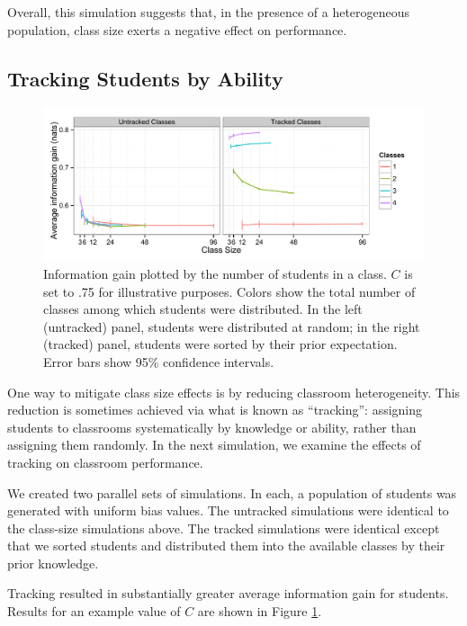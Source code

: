 \documentclass[10pt,letterpaper]{article}
\begin{document}
Overall, this simulation suggests that, in the presence of a heterogeneous population, class size exerts a negative effect on performance. 

\subsection{Tracking Students by Ability}

\begin{figure}
\begin{center}
\includegraphics[width=5.5in]{figures/tracking.pdf}
\end{center}
\caption{\label{fig:tracking} Information gain plotted by the number of students in a class. $C$ is set to .75 for illustrative purposes. Colors show the total number of classes among which students were distributed. In the left (untracked) panel, students were distributed at random; in the right (tracked) panel, students were sorted by their prior expectation. Error bars show 95\% confidence intervals.}
\end{figure}

One way to mitigate class size effects is by reducing classroom heterogeneity. This reduction is sometimes achieved via what is known as ``tracking'': assigning students to classrooms systematically by knowledge or ability, rather than assigning them randomly. In the next simulation, we examine the effects of tracking on classroom performance. 

We created two parallel sets of simulations. In each, a population of students was generated with uniform bias values. The untracked simulations were identical to the class-size simulations above. The tracked simulations were identical except that we sorted students and distributed them into the available classes by their prior knowledge. 

Tracking resulted in substantially greater average information gain for students. Results for an example value of $C$ are shown in Figure \ref{fig:tracking}.
\end{document}
